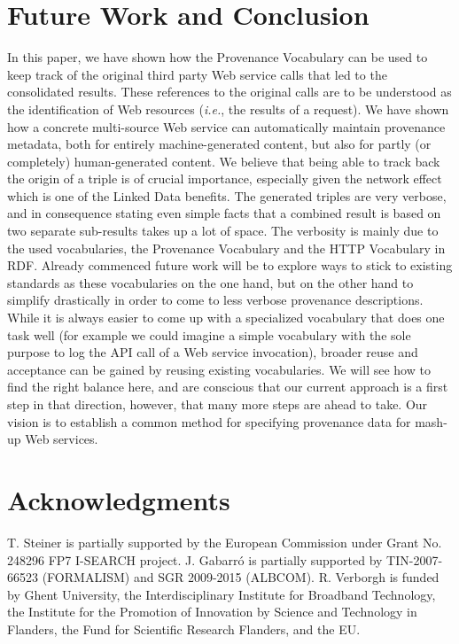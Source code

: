\documentclass[twocolumn]{article}
\begin{document}
\section{Future Work and Conclusion}                                                        
\label{sec:conclusion}
In this paper, we have shown how the Provenance
Vocabulary can be used to keep track of the original third party Web service calls that led to the consolidated
results. These references to the original calls are to be understood as the identification of Web resources (\emph{i.e.}, the
results of a request). We have shown how a concrete multi-source Web service can automatically maintain provenance
metadata, both for entirely machine-generated content, but also for partly (or completely) human-generated content. We
believe that being able to track back the origin of a triple is of crucial importance, especially given the network
effect which is one of the Linked Data benefits. The generated triples are very verbose, and in consequence stating even simple facts that a combined result is based on two separate sub-results takes up a lot of space. The verbosity is mainly due to the used vocabularies, the Provenance Vocabulary and the HTTP Vocabulary in RDF.
Already commenced future work will be to explore ways to stick to existing standards as these vocabularies on the one hand, but on the other hand to simplify drastically in order to come to less verbose provenance descriptions. While it is always easier to come up with a specialized vocabulary that does one task well (for example we could imagine a simple vocabulary with the sole purpose to log the API call of a Web service invocation), broader reuse and acceptance can be gained by reusing existing vocabularies. We will see how to find the right balance here, and are conscious that our current approach is a first step in that direction, however, that many more steps are ahead to take. Our vision is to establish a common method for specifying provenance data for mash-up Web services. 

\section*{Acknowledgments}
T. Steiner is partially supported by the European Commission under Grant No. 248296 FP7 I-SEARCH project. J. Gabarr\'o is partially supported by TIN-2007-66523 (FORMALISM) and SGR 2009-2015 (ALBCOM). 
R. Verborgh is funded by Ghent University, the Interdisciplinary Institute for Broadband Technology, the Institute for the Promotion of Innovation by Science and Technology in Flanders, the Fund for Scientific Research Flanders, and the EU.
\newpage


\end{document}
